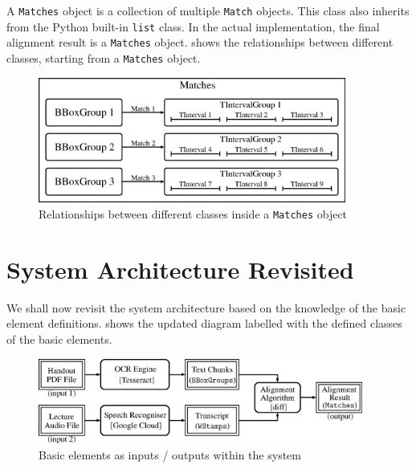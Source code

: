 A \texttt{Matches} object is a collection of multiple \texttt{Match} objects. This class also inherits from the Python built-in \texttt{list} class. In the actual implementation, the final alignment result is a \texttt{Matches} object.  shows the relationships between different classes, starting from a \texttt{Matches} object.

\begin{figure}[t]
    \centering
    \includegraphics[width=0.9\textwidth]{elem-matches.eps}
    \caption{Relationships between different classes inside a \texttt{Matches} object}
    \label{fig:elem-matches}
\end{figure}

\section{System Architecture Revisited}

We shall now revisit the system architecture based on the knowledge of the basic element definitions.  shows the updated diagram labelled with the defined classes of the basic elements.

\begin{figure}[!hb]
    \centering
    \includegraphics[width=0.95\textwidth]{elem-sys-diagram.eps}
    \caption{Basic elements as inputs / outputs within the system}
    \label{fig:elem-sys-diagram}
\end{figure}